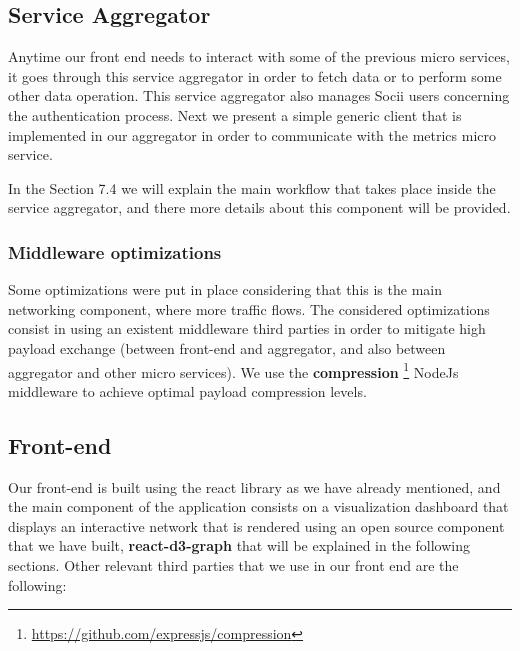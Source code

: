 

\subsection{Service Aggregator}
Anytime our front end needs to interact with some of the previous micro services, it goes through this service aggregator
in order to fetch data or to perform some other data operation. This service aggregator also manages Socii users concerning the authentication process.
Next we present a simple generic client that is implemented in our aggregator in order to communicate with the metrics micro service.



In the Section 7.4 we will explain the main workflow that takes place inside the service aggregator, and there more details about this component will be provided.

\subsubsection{Middleware optimizations}
Some optimizations were put in place considering that this is the main networking component, where more traffic flows. The considered optimizations consist in using an existent middleware third parties in order to mitigate high payload exchange (between front-end and aggregator, and also between aggregator and other micro services). We use the \textbf{compression} \footnote{\url{https://github.com/expressjs/compression}} NodeJs middleware to achieve optimal payload compression levels.

\subsection{Front-end}

Our front-end is built using the react library as we have already mentioned, and the main component of the application consists on a visualization dashboard that displays an interactive network that is rendered using an open source component that we have built, \textbf{react-d3-graph} \citep{reactd3graph} that will be explained in the following sections. Other relevant third parties that we use in our front end are the following:

